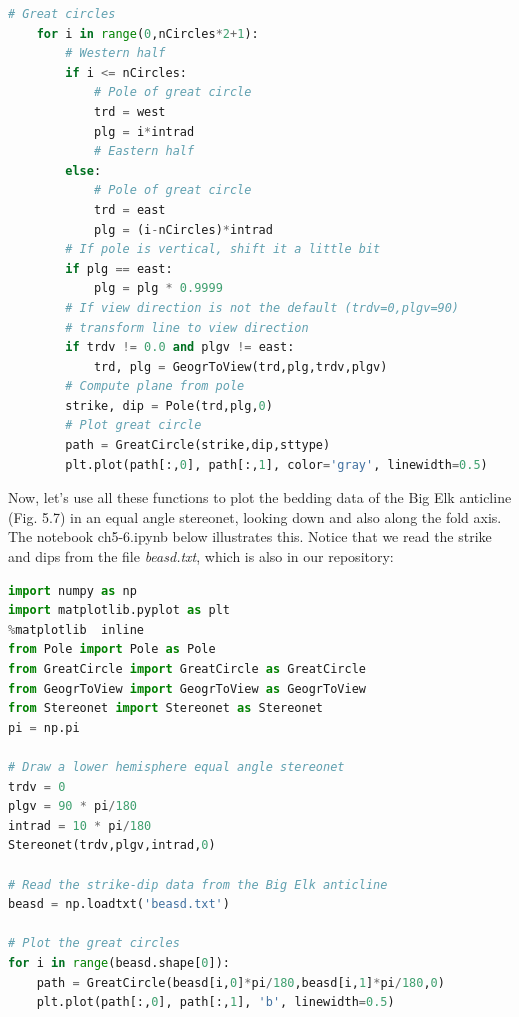 \documentclass[a4paper , 12pt]{book}
\begin{document}
\begin{lstlisting}[language=Python, frame=single]
    # Great circles
    for i in range(0,nCircles*2+1):
        # Western half
        if i <= nCircles:
            # Pole of great circle
            trd = west
            plg = i*intrad
            # Eastern half
        else:
            # Pole of great circle
            trd = east
            plg = (i-nCircles)*intrad
        # If pole is vertical, shift it a little bit
        if plg == east:
            plg = plg * 0.9999
        # If view direction is not the default (trdv=0,plgv=90)
        # transform line to view direction
        if trdv != 0.0 and plgv != east:
            trd, plg = GeogrToView(trd,plg,trdv,plgv)
        # Compute plane from pole
        strike, dip = Pole(trd,plg,0)
        # Plot great circle
        path = GreatCircle(strike,dip,sttype)
        plt.plot(path[:,0], path[:,1], color='gray', linewidth=0.5)
\end{lstlisting}

Now, let's use all these functions to plot the bedding data of the Big Elk anticline (Fig. 5.7) in an equal angle stereonet, looking down and also along the fold axis. The notebook ch5-6.ipynb below illustrates this. Notice that we read the strike and dips from the file \textit{beasd.txt}, which is also in our repository:

\begin{center}
\begin{lstlisting}[language=Python, frame=single]
import numpy as np
import matplotlib.pyplot as plt
%matplotlib  inline
from Pole import Pole as Pole
from GreatCircle import GreatCircle as GreatCircle
from GeogrToView import GeogrToView as GeogrToView
from Stereonet import Stereonet as Stereonet
pi = np.pi

# Draw a lower hemisphere equal angle stereonet
trdv = 0
plgv = 90 * pi/180
intrad = 10 * pi/180
Stereonet(trdv,plgv,intrad,0)

# Read the strike-dip data from the Big Elk anticline
beasd = np.loadtxt('beasd.txt')

# Plot the great circles
for i in range(beasd.shape[0]):
    path = GreatCircle(beasd[i,0]*pi/180,beasd[i,1]*pi/180,0)
    plt.plot(path[:,0], path[:,1], 'b', linewidth=0.5) 
\end{lstlisting}
\end{center}
\end{document}
